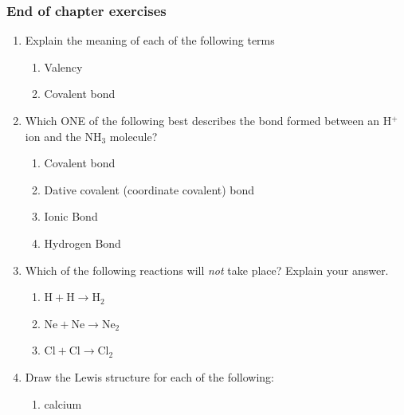             \subsubsection{ End of chapter exercises }
            \nopagebreak
      \label{m38689*id147820}\begin{enumerate}[noitemsep, label=\textbf{\arabic*}. ] 
            \label{m38689*uid158}\item Explain the meaning of each of the following terms
\label{m38689*id147842}\begin{enumerate}[noitemsep, label=\textbf{\alph*}. ] 
            \label{m38689*uid159}\item Valency
\label{m38689*uid160}\item Covalent bond
\end{enumerate}
                \label{m38689*uid162}\item Which ONE of the following best describes the bond formed between an $\mathrm{H}{}^{+}$ ion and the $\mathrm{NH}{}_{3}$ molecule?
\label{m38689*id147923}\begin{enumerate}[noitemsep, label=\textbf{\alph*}. ] 
            \label{m38689*uid163}\item Covalent bond
\label{m38689*uid164}\item Dative covalent (coordinate covalent) bond
\label{m38689*uid165}\item Ionic Bond
\label{m38689*uid166}\item Hydrogen Bond
\end{enumerate}
                \label{m38689*uid171}\item Which of the following reactions will \textsl{not} take place? Explain your answer.
\label{m38689*id148047}\begin{enumerate}[noitemsep, label=\textbf{\alph*}. ] 
            \label{m38689*uid172}\item $\mathrm{H}+\mathrm{H}\to {\mathrm{H}}_{2}$\label{m38689*uid173}\item $\mathrm{Ne}+\mathrm{Ne}\to {\mathrm{Ne}}_{2}$\label{m38689*uid174}\item $\mathrm{Cl}+\mathrm{Cl}\to {\mathrm{Cl}}_{2}$\end{enumerate}
                \label{m38689*uid175}\item Draw the Lewis structure for each of the following:
\label{m38689*id148172}\begin{enumerate}[noitemsep, label=\textbf{\alph*}. ] 
            \label{m38689*uid176}\item calcium

\end{enumerate}
\end{enumerate}
